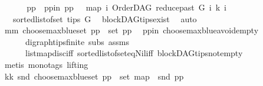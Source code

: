 \begin{isabellebody}
%
\isadelimproof
%
\endisadelimproof
%
\isatagproof
{}\isamarkupfalse%
\ {\isacharminus}{\kern0pt}\ \isanewline
\ \ \isamarkupfalse%
\ pp\ \ pp{\isacharunderscore}{\kern0pt}in{\isacharcolon}{\kern0pt}\ {\isachardoublequoteopen}pp\ {\isacharequal}{\kern0pt}\ \ {\isacharparenleft}{\kern0pt}map\ {\isacharparenleft}{\kern0pt}{\isasymlambda}i{\isachardot}{\kern0pt}\ {\isacharparenleft}{\kern0pt}OrderDAG\ {\isacharparenleft}{\kern0pt}reduce{\isacharunderscore}{\kern0pt}past\ G\ i{\isacharparenright}{\kern0pt}\ k{\isacharcomma}{\kern0pt}\ i{\isacharparenright}{\kern0pt}{\isacharparenright}{\kern0pt}\isanewline
\ \ \ {\isacharparenleft}{\kern0pt}sorted{\isacharunderscore}{\kern0pt}list{\isacharunderscore}{\kern0pt}of{\isacharunderscore}{\kern0pt}set\ {\isacharparenleft}{\kern0pt}tips\ G{\isacharparenright}{\kern0pt}{\isacharparenright}{\kern0pt}{\isacharparenright}{\kern0pt}{\isachardoublequoteclose}\ \isamarkupfalse%
\ blockDAG{\isachardot}{\kern0pt}tips{\isacharunderscore}{\kern0pt}exist\ \isamarkupfalse%
\ auto\isanewline
\ \ \isamarkupfalse%
\ mm{\isacharcolon}{\kern0pt}\ {\isachardoublequoteopen}choose{\isacharunderscore}{\kern0pt}max{\isacharunderscore}{\kern0pt}blue{\isacharunderscore}{\kern0pt}set\ pp\ {\isasymin}\ set\ pp{\isachardoublequoteclose}\ \isamarkupfalse%
\ pp{\isacharunderscore}{\kern0pt}in\ choose{\isacharunderscore}{\kern0pt}max{\isacharunderscore}{\kern0pt}blue{\isacharunderscore}{\kern0pt}avoid{\isacharunderscore}{\kern0pt}empty\isanewline
\ \ \ \ \ \ digraph{\isachardot}{\kern0pt}tips{\isacharunderscore}{\kern0pt}finite\ subs\ assms{\isacharparenleft}{\kern0pt}{}{\isacharparenright}{\kern0pt}\isanewline
\ \ \ \ \ \ list{\isachardot}{\kern0pt}map{\isacharunderscore}{\kern0pt}disc{\isacharunderscore}{\kern0pt}iff\ sorted{\isacharunderscore}{\kern0pt}list{\isacharunderscore}{\kern0pt}of{\isacharunderscore}{\kern0pt}set{\isacharunderscore}{\kern0pt}eq{\isacharunderscore}{\kern0pt}Nil{\isacharunderscore}{\kern0pt}iff\ blockDAG{\isachardot}{\kern0pt}tips{\isacharunderscore}{\kern0pt}not{\isacharunderscore}{\kern0pt}empty\ \isanewline
\ \ \ \ \isamarkupfalse%
\ {\isacharparenleft}{\kern0pt}metis\ {\isacharparenleft}{\kern0pt}mono{\isacharunderscore}{\kern0pt}tags{\isacharcomma}{\kern0pt}\ lifting{\isacharparenright}{\kern0pt}{\isacharparenright}{\kern0pt}\ \ \isanewline
\ \ \isamarkupfalse%
\ \isamarkupfalse%
\ kk{\isacharcolon}{\kern0pt}\ {\isachardoublequoteopen}snd\ {\isacharparenleft}{\kern0pt}choose{\isacharunderscore}{\kern0pt}max{\isacharunderscore}{\kern0pt}blue{\isacharunderscore}{\kern0pt}set\ pp{\isacharparenright}{\kern0pt}\ {\isasymin}\ set\ {\isacharparenleft}{\kern0pt}map\ \ snd\ pp{\isacharparenright}{\kern0pt}{\isachardoublequoteclose}\isanewline

\end{isabellebody}
